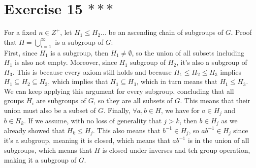 \documentclass[12pt]{article}
\begin{document}
    \section*{Exercise 15 $***$}
    For a fixed $n \in Z^+$, let $H_1 \leqslant H_2 \dots$
    be an ascending chain of subgroups of $G$.
    Proof that $H = \bigcup_{i = 1}^{\infty}$ is a subgroup of $G$: \\
    First, since $H_1$ is a subgroup, then $H_1 \neq \emptyset$,
    so the union of all subsets including $H_1$ is also not empty.
    Moreover, since $H_1$ subgroup of $H_2$, it's also a subgroup of $H_3$.
    This is because every axiom still holds
    and because $H_1 \leqslant H_2 \leqslant H_3$ implies
    $H_1 \subseteq H_2 \subseteq H_3$,
    which implies that $H_1 \subseteq H_3$,
    which in turn means that $H_1 \leqslant H_3$.
    We can keep applying this argument for every subgroup,
    concluding that all groups $H_i$ are subgroups of $G$,
    so they are all subsets of $G$.
    This means that their union must also be a subset of $G$.
    Finally, $\forall a, b \in H$,
    we have for $a \in H_j$ and $b \in H_k$.
    If we assume, with no loss of generality that $j > k$,
    then $b \in H_j$ as we already showed that $H_k \leqslant H_j$.
    This also means that $b^{-1} \in H_j$,
    so $ab^{-1} \in H_j$ since it's a subgroup, meaning it is closed,
    which means that $ab^{-1}$ is in the union of all subgroups,
    which means that $H$ is closed under inverses and teh group operation,
    making it a subgroup of $G$. 
\end{document}
